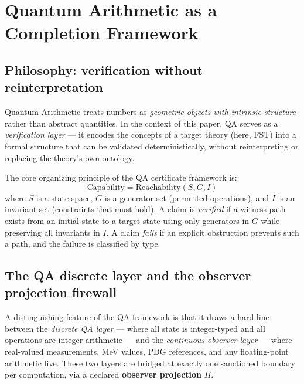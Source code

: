 \documentclass[12pt,a4paper]{article}
\begin{document}

\section{Quantum Arithmetic as a Completion Framework}

\subsection{Philosophy: verification without reinterpretation}

Quantum Arithmetic treats numbers as \emph{geometric objects with intrinsic
structure} rather than abstract quantities. In the context of this paper,
QA serves as a \emph{verification layer} --- it encodes the concepts of a
target theory (here, FST) into a formal structure that can be validated
deterministically, without reinterpreting or replacing the theory's own
ontology.

The core organizing principle of the QA certificate framework is:
\begin{equation}
  \mathrm{Capability} = \mathrm{Reachability}(S, G, I)
\end{equation}
where $S$ is a state space, $G$ is a generator set (permitted operations),
and $I$ is an invariant set (constraints that must hold). A claim is
\emph{verified} if a witness path exists from an initial state to a target
state using only generators in $G$ while preserving all invariants in $I$.
A claim \emph{fails} if an explicit obstruction prevents such a path, and
the failure is classified by type.

\subsection{The QA discrete layer and the observer projection firewall}
\label{sec:theorem-nt}

A distinguishing feature of the QA framework is that it draws a hard
line between the \emph{discrete QA layer} --- where all state is
integer-typed and all operations are integer arithmetic --- and the
\emph{continuous observer layer} --- where real-valued measurements,
MeV values, PDG references, and any floating-point arithmetic live.
These two layers are bridged at exactly one sanctioned boundary per
computation, via a declared \textbf{observer projection} $\Pi$.
\end{document}
